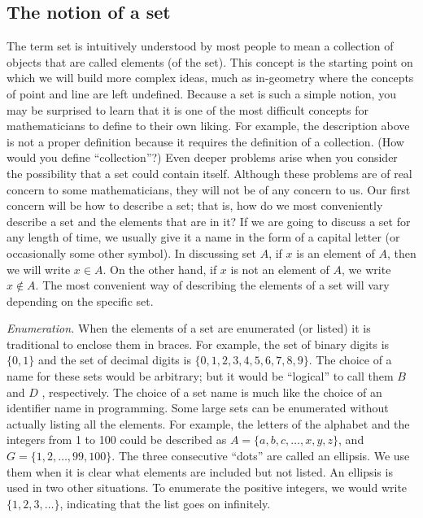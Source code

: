 \documentclass[10pt,]{book}
\theoremstyle{plain}
\theoremstyle{definition}
\theoremstyle{definition}
\theoremstyle{definition}
\theoremstyle{definition}
\begin{document}
\subsection[The notion of a set]{The notion of a set}\label{subsection-1}
The term set is intuitively understood by most people to mean a collection of objects that are called elements (of the set). This concept is the
starting point on which we will build more complex ideas, much as in-geometry where the concepts of point and line are left undefined. 
Because a set is such a simple notion, you may be surprised to learn that it is one of the most difficult concepts for mathematicians to define to
their own liking. For example, the description above is not a proper definition because it requires the definition of a collection. (How would you
define ``collection''?) Even deeper problems arise when you consider the possibility that a set could contain itself. Although these problems
are of real concern to some mathematicians, they will not be of any concern to us. 
Our first concern will be how to describe a set; that is, how do we most conveniently describe a set and the elements that are in it? If we are going to discuss a set for any length of time, we usually give it a name in the form of a capital letter (or occasionally some other symbol). In discussing set \( A\), if \( x\) is an element of \( A\), then we will write \(x \in  A\).\label{notation-1}
 On the other hand, if \( x\) is not an element
of \( A\), we write \(x \notin  A\).\label{notation-2}
 The most convenient way of describing the elements of a set will vary depending on the specific set. %
\par
\emph{ Enumeration.} When the elements of a set are enumerated (or listed) it is traditional to enclose them in braces. For example, the
set of binary digits is\(\{0, 1\}\) and the set of decimal digits is \(\{0, 1, 2, 3, 4, 5, 6, 7, 8, 9\}\). The choice of a name for these sets would
be arbitrary; but it would be ``logical'' to call them \( B\) and \( D\) , respectively. The choice of a set name is much like the
choice of an identifier name in programming. Some large sets can be enumerated without actually listing all the elements. For example, the letters
of the alphabet and the integers from 1 to 100 could be described as 
\(A = \{a, b, c,\ldots , x, y, z\}\), and \(G = \{1, 2, \ldots  , 99, 100\}\). 
The three consecutive ``dots'' are called an ellipsis. We use them when it is clear what elements are included but not listed. An ellipsis is
used in two other situations. To enumerate the positive integers, we would write \(\{1, 2, 3,\ldots  \}\), indicating that the list goes on infinitely.
\end{document}
